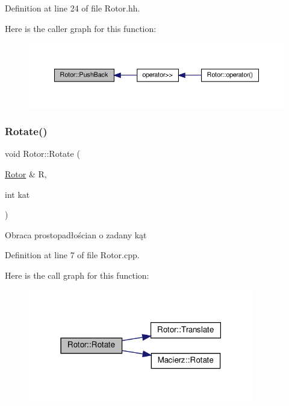 Definition at line 24 of file Rotor.\+hh.

Here is the caller graph for this function\+:
\nopagebreak
\begin{figure}[H]
\begin{center}
\leavevmode
\includegraphics[width=350pt]{class_rotor_a987eda3f97cef17d1201057078185ad6_icgraph}
\end{center}
\end{figure}
\mbox{\label{class_rotor_a021ab148b8734f0a82d502c999dd41be}} 
\subsubsection{\texorpdfstring{Rotate()}{Rotate()}}
{\footnotesize\ttfamily void Rotor\+::\+Rotate (\begin{DoxyParamCaption}\item[{\hyperlink{class_rotor}{Rotor} \&}]{R,  }\item[{int}]{kat }\end{DoxyParamCaption})}

Obraca prostopadłościan o zadany kąt 

Definition at line 7 of file Rotor.\+cpp.

Here is the call graph for this function\+:
\nopagebreak
\begin{figure}[H]
\begin{center}
\leavevmode
\includegraphics[width=279pt]{class_rotor_a021ab148b8734f0a82d502c999dd41be_cgraph}
\end{center}
\end{figure}
\mbox{\label{class_rotor_a1f00a40e0e40e8f8cf7cb15160c88cc2}} 
